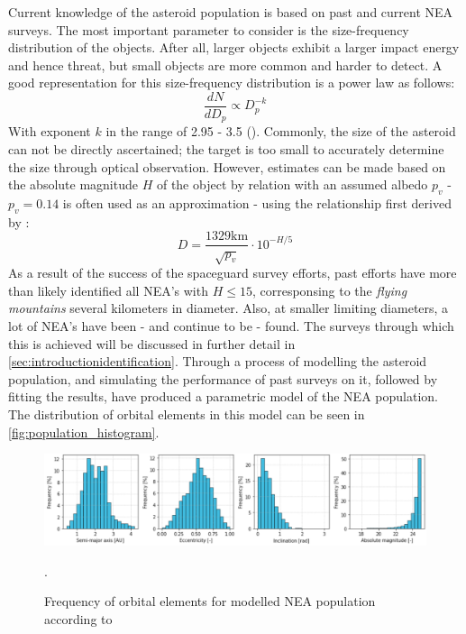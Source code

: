 Current knowledge of the asteroid population is based on past and current NEA surveys. The most important parameter to consider is the size-frequency distribution of the objects. After all, larger objects exhibit a larger impact energy and hence threat, but small objects are more common and harder to detect. A good representation for this size-frequency distribution is a power law as follows:
\begin{equation}
 \frac{dN}{dD_p} \propto D_p^{-k}
 \label{eq:sizefreqlaw}
\end{equation}
With exponent $k$ in the range of 2.95 - 3.5 (\cite{AsteroidSizeFrequency}). Commonly, the size of the asteroid can not be directly ascertained; the target is too small to accurately determine the size through optical observation. However, estimates can be made based on the absolute magnitude $H$ of the object by relation with an assumed albedo $p_v$ - $p_v = 0.14$ is often used as an approximation - using the relationship first derived by \cite{AsteroidSizeAlbedo}:
\begin{equation}
 D = \frac{1329 \mathrm{km}}{\sqrt{p_v}}\cdot 10^{-H/5}
 \label{eq:asteroidsize}
\end{equation}
As a result of the success of the spaceguard survey efforts, past efforts have more than likely identified all NEA's with $H \leq 15$, corresponsing to the \textit{flying mountains} several kilometers in diameter. Also, at smaller limiting diameters, a lot of NEA's have been - and continue to be - found. The surveys through which this is achieved will be discussed in further detail in \autoref{sec:introductionidentification}. Through a process of modelling the asteroid population, and simulating the performance of past surveys on it, followed by fitting the results, \cite{GranvikPopulation} have produced a parametric model of the NEA population. The distribution of orbital elements in this model can be seen in \autoref{fig:population_histogram}. \\

\begin{figure}[htbp]
 \centering
 \includegraphics[width=1.0\textwidth]{img/population_histogram.png}
 \caption{Frequency of orbital elements for modelled NEA population according to \cite{GranvikPopulation}}.
 \label{fig:population_histogram}
\end{figure}

